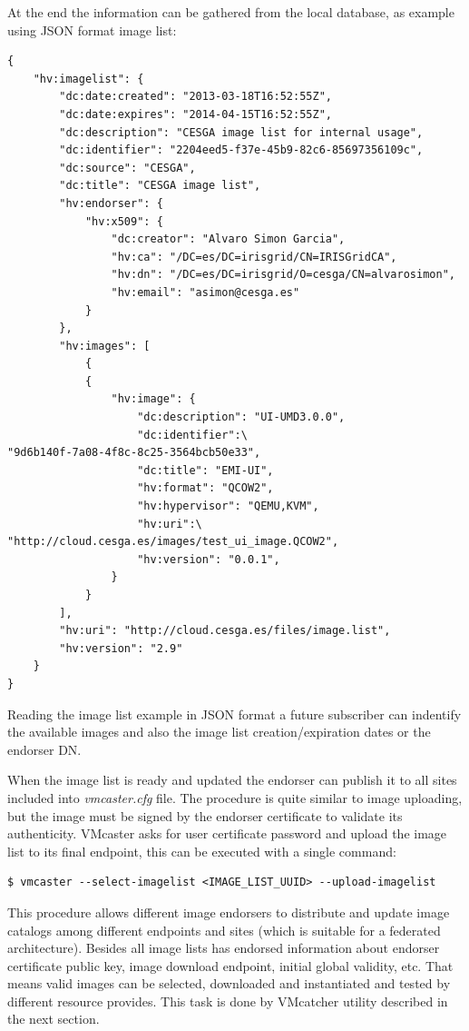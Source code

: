 \documentclass{llncs_Ibergrid2013}
\begin{document}
At the end the information can be gathered from the local database, as example using JSON format image list:
\begin{verbatim}
{
    "hv:imagelist": {
        "dc:date:created": "2013-03-18T16:52:55Z", 
        "dc:date:expires": "2014-04-15T16:52:55Z", 
        "dc:description": "CESGA image list for internal usage", 
        "dc:identifier": "2204eed5-f37e-45b9-82c6-85697356109c", 
        "dc:source": "CESGA", 
        "dc:title": "CESGA image list", 
        "hv:endorser": {
            "hv:x509": {
                "dc:creator": "Alvaro Simon Garcia", 
                "hv:ca": "/DC=es/DC=irisgrid/CN=IRISGridCA", 
                "hv:dn": "/DC=es/DC=irisgrid/O=cesga/CN=alvarosimon", 
                "hv:email": "asimon@cesga.es"
            }
        }, 
        "hv:images": [
            {
            {
                "hv:image": {
                    "dc:description": "UI-UMD3.0.0", 
                    "dc:identifier":\ 
"9d6b140f-7a08-4f8c-8c25-3564bcb50e33", 
                    "dc:title": "EMI-UI", 
                    "hv:format": "QCOW2", 
                    "hv:hypervisor": "QEMU,KVM",  
                    "hv:uri":\ 
"http://cloud.cesga.es/images/test_ui_image.QCOW2", 
                    "hv:version": "0.0.1", 
                }
            }
        ], 
        "hv:uri": "http://cloud.cesga.es/files/image.list", 
        "hv:version": "2.9"
    }
}
\end{verbatim}
Reading the image list example in JSON format a future subscriber can indentify the available images and also the image list creation/expiration dates or the endorser DN.

When the image list is ready and updated the endorser can publish it to all sites included into \textit{vmcaster.cfg} file. 
The procedure is quite similar to image uploading, but the image must be signed by the endorser certificate to validate its authenticity.
VMcaster asks for user certificate password and upload the image list to its final endpoint, this can be executed with a single command:
\begin{verbatim}
$ vmcaster --select-imagelist <IMAGE_LIST_UUID> --upload-imagelist
\end{verbatim}
This procedure allows different image endorsers to distribute and update image catalogs among different endpoints and sites (which is suitable for a federated architecture).
Besides all image lists has endorsed information about endorser certificate public key, image download endpoint, initial global validity, etc. 
That means valid images can be selected, downloaded and instantiated and tested by different resource provides. 
This task is done by VMcatcher utility described in the next section.
\end{document}
